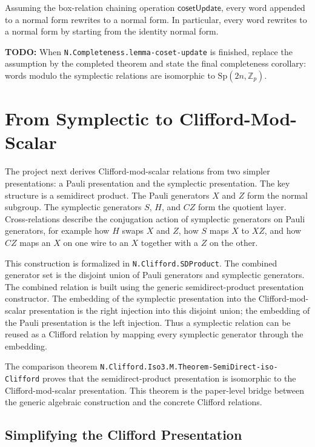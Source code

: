 \documentclass[acmsmall,screen,review,anonymous]{acmart}
\newcommand{\Zp}{\mathbb{Z}_p}
\newcommand{\Sp}{\mathrm{Sp}}
\newcommand{\code}[1]{\texttt{#1}}
\newcommand{\codepath}[1]{\nolinkurl{#1}}
\newcommand{\todo}[1]{\textbf{TODO:} #1}
\begin{document}
\begin{theorem}
Assuming the box-relation chaining operation \(\mathsf{cosetUpdate}\), every
word appended to a normal form rewrites to a normal form. In particular, every
word rewrites to a normal form by starting from the identity normal form.
\end{theorem}

\todo{When \code{N.Completeness.lemma-coset-update} is finished, replace the
assumption by the completed theorem and state the final completeness corollary:
words modulo the symplectic relations are isomorphic to \(\Sp(2n,\Zp)\).}

\section{From Symplectic to Clifford-Mod-Scalar}
\label{sec:clifford}

The project next derives Clifford-mod-scalar relations from two simpler
presentations: a Pauli presentation and the symplectic presentation. The key
structure is a semidirect product. The Pauli generators \(X\) and \(Z\) form the
normal subgroup. The symplectic generators \(S\), \(H\), and \(CZ\) form the
quotient layer. Cross-relations describe the conjugation action of symplectic
generators on Pauli generators, for example how \(H\) swaps \(X\) and \(Z\), how
\(S\) maps \(X\) to \(XZ\), and how \(CZ\) maps an \(X\) on one wire to an
\(X\) together with a \(Z\) on the other.

This construction is formalized in \code{N.Clifford.SDProduct}. The combined
generator set is the disjoint union of Pauli generators and symplectic
generators. The combined relation is built using the generic semidirect-product
presentation constructor. The embedding of the symplectic presentation into the
Clifford-mod-scalar presentation is the right injection into this disjoint
union; the embedding of the Pauli presentation is the left injection. Thus a
symplectic relation can be reused as a Clifford relation by mapping every
symplectic generator through the embedding.

The comparison theorem \codepath{N.Clifford.Iso3.M.Theorem-SemiDirect-iso-Clifford}
proves that the semidirect-product presentation is isomorphic to the
Clifford-mod-scalar presentation. This theorem is the paper-level bridge
between the generic algebraic construction and the concrete Clifford relations.

\subsection{Simplifying the Clifford Presentation}
\end{document}
